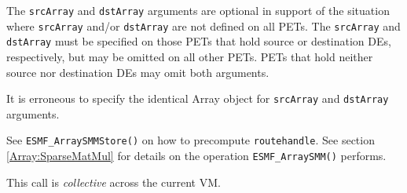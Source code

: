      The {\tt srcArray} and {\tt dstArray} arguments are optional in support of
     the situation where {\tt srcArray} and/or {\tt dstArray} are not defined on
     all PETs. The {\tt srcArray} and {\tt dstArray} must be specified on those
     PETs that hold source or destination DEs, respectively, but may be omitted
     on all other PETs. PETs that hold neither source nor destination DEs may
     omit both arguments.
  
     It is erroneous to specify the identical Array object for {\tt srcArray} and
     {\tt dstArray} arguments.
  
     See {\tt ESMF\_ArraySMMStore()} on how to precompute 
     {\tt routehandle}. See section \ref{Array:SparseMatMul} for details on the
     operation {\tt ESMF\_ArraySMM()} performs.
  
     This call is {\em collective} across the current VM.
  
